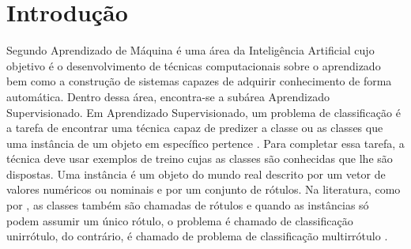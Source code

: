\newcommand{\NbasesV}{\textit{N}}
\newcommand{\Nbases}{6}
\newcommand{\Nml}{6}
\newcommand{\NmlT}{5}
\newcommand{\NmlA}{2}
\newcommand{\Ncb}{4}
\newcommand{\MML}{método multirrótulo}
\newcommand{\MMLs}{métodos multirrótulo}
\newcommand{\MRLM}{Recursive Dependent Binary Relevance}
\newcommand{\MRLMa}{RDBR}


\newcommand{\jqo}{J48}
\newcommand{\EBA}{Example Based Accuracy}
\newcommand{\SA}{\textit{Subset Accuracy}}
\newcommand{\HL}{\textit{Hamming Loss}}
\newcommand{\CC}{\textit{Classifier Chain}}
\newcommand{\ECC}{\textit{Ensemble of }~\CC}
\newcommand{\BR}{\textit{Binary Relevance}}
\newcommand{\tabmode}{h}
\newcommand{\legendaTab}[2]{Desempenho dos métodos multirrótulos com \textit{#2} medidos pelas métricas \SA,\HL~e~\EBA}

\chapter{Introdução}
Segundo \cite{rezende2003sistemas} Aprendizado de Máquina é uma área da Inteligência Artificial
cujo objetivo é o desenvolvimento de técnicas computacionais
sobre o aprendizado bem como a construção de sistemas capazes de adquirir
conhecimento de forma automática. Dentro dessa área, encontra-se a subárea Aprendizado Supervisionado.
Em Aprendizado Supervisionado, um problema de classificação é a tarefa de encontrar
uma técnica capaz de predizer a classe ou as classes que uma instância de
um objeto em específico pertence \cite{rezende2003sistemas}.
Para completar essa tarefa, a técnica deve usar exemplos de treino cujas as classes
são conhecidas que lhe são dispostas. Uma instância é um objeto do mundo real descrito
por um vetor de valores numéricos ou nominais e por um conjunto de rótulos.
Na literatura, como por \cite{rezende2003sistemas}, as classes também são chamadas de rótulos
e quando as instâncias só podem assumir um único rótulo, o problema é chamado de classificação unirrótulo,
do contrário, é chamado de problema de classificação multirrótulo \cite{borges2012}.

